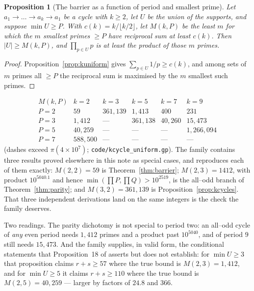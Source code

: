 \documentclass[11pt]{article}
\newtheorem{proposition}[theorem]{Proposition}
\theoremstyle{definition}
\begin{document}
\begin{proposition}[The barrier as a function of period and smallest prime]\label{prop:twoparam}
Let $a_1\to\dots\to a_k\to a_1$ be a cycle with $k\ge2$, let $U$ be the union of the supports, and
suppose $\min U\ge P$. With $c(k)=k/\lfloor k/2\rfloor$, let $M(k,P)$ be the least $m$ for which the
$m$ smallest primes $\ge P$ have reciprocal sum at least $c(k)$. Then $|U|\ge M(k,P)$, and
$\prod_{p\in U}p$ is at least the product of those $m$ primes.
\end{proposition}
\begin{proof}
Proposition~\ref{prop:kuniform} gives $\sum_{p\in U}1/p\ge c(k)$, and among sets of $m$ primes all
$\ge P$ the reciprocal sum is maximised by the $m$ smallest such primes.
\end{proof}

\[
\begin{array}{l|ccccc}
M(k,P) & k=2 & k=3 & k=5 & k=7 & k=9\\\hline
P=2 & 59 & 361{,}139 & 1{,}413 & 400 & 231\\
P=3 & 1{,}412 & \text{---} & 361{,}138 & 40{,}260 & 15{,}473\\
P=5 & 40{,}259 & \text{---} & \text{---} & \text{---} & 1{,}266{,}094\\
P=7 & 588{,}500 & \text{---} & \text{---} & \text{---} & \text{---}
\end{array}
\]
(dashes exceed $\pi(4\times10^{7})$; \texttt{code/kcycle\_uniform.gp}). The family contains three
results proved elsewhere in this note as special cases, and reproduces each of them exactly:
$M(2,2)=59$ is Theorem~\ref{thm:barrier}; $M(2,3)=1412$, with product $10^{5040.1}$ and hence
$\min(\prod P,\prod Q)>10^{2519}$, is the all--odd branch of Theorem~\ref{thm:parity}; and
$M(3,2)=361{,}139$ is Proposition~\ref{prop:kcycles}. That three independent derivations land on the
same integers is the check the family deserves.

Two readings. The parity dichotomy is not special to period two: an all--odd cycle of \emph{any} even
period needs $1{,}412$ primes and a product past $10^{5040}$, and of period $9$ still needs
$15{,}473$. And the family supplies, in valid form, the conditional statements that
Proposition~18 of \cite{Kovic2012} asserts but does not establish: for $\min U\ge3$ that proposition
claims $r+s\ge57$ where the true bound is $M(2,3)=1{,}412$, and for $\min U\ge5$ it claims
$r+s\ge110$ where the true bound is $M(2,5)=40{,}259$ --- larger by factors of $24.8$ and $366$.
\end{document}
